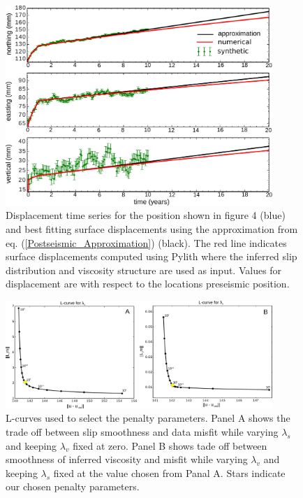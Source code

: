 \documentclass[extra]{gji}
\begin{document}
\begin{figure}[h!]\label{figure5}
  \centering
  \includegraphics[width=0.9\textwidth]{FinalFigures/Figure5.pdf}
  \caption{Displacement time series for the position shown in figure 4
    (blue) and best fitting surface displacements using the
    approximation from eq. (\ref{Postseismic_Approximation}) (black).
    The red line indicates surface displacements computed using Pylith
    where the inferred slip distribution and viscosity structure are
    used as input. Values for displacement are with respect to the
    locations preseismic position.}  
  \label{figure 5}
\end{figure}

\begin{figure}[h!]\label{figure6}
  \centering
  \includegraphics[width=0.9\textwidth]{FinalFigures/Figure6.pdf}
  \caption{L-curves used to select the penalty parameters. Panel A
    shows the trade off between slip smoothness and data misfit while
    varying $\lambda_s$ and keeping $\lambda_v$ fixed at zero.  Panel
    B shows tade off between smoothness of inferred viscosity and
    misfit while varying $\lambda_v$ and keeping $\lambda_s$ fixed at
    the value chosen from Panal A.  Stars indicate our chosen penalty
    parameters.}
  \label{figure 6}
\end{figure}
\end{document}

